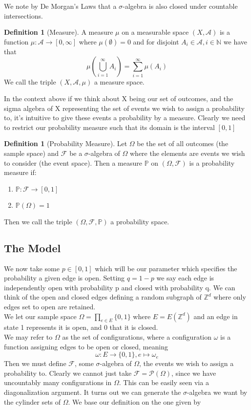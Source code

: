 \documentclass[a4paper,11pt]{article}
\theoremstyle{definition}
\newtheorem{definition}[theorem]{Definition}
\newcommand{\ints}{\mathbb{Z}}
\newcommand{\sigalg}{$\sigma$-algebra }
\begin{document}
We note by De Morgan's Laws that a $\sigma$-algebra is also closed under countable intersections.

\begin{definition}[Measure]
	A measure $\mu$ on a measurable space $(X,\mathcal{A})$ is a function $\mu: \mathcal{A} \rightarrow [0,\infty]$ where 
	$\mu(\emptyset) = 0 $ and for disjoint $A_i \in \mathcal{A}, i \in \mathbb{N}$ we have that
	$$ \mu(\bigcup^\infty_{i=1} A_i) = \sum_{i = 1}^{\infty} \mu(A_i)  $$
	We call the triple $(X,\mathcal{A},\mu)$ a measure space.
\end{definition}

In the context above if we think about X being our set of outcomes, and the sigma algebra of X representing the set of events we wish to assign a probability to, it's intuitive to give these events a probability by a measure. 
Clearly we need to restrict our probability measure such that its domain is the interval $[0,1]$ 

\begin{definition}[Probability Measure]
	Let $\Omega$ be the set of all outcomes (the sample space) and $\mathcal{F}$ be a \sigalg of $\Omega$ where the elements are events we wish to consider (the event space). Then a measure $\mathbb{P}$ on $(\Omega,\mathcal{F})$ is a probability measure if:
	\begin{enumerate}
		\item $\mathbb{P}: \mathcal{F} \rightarrow [0,1]$
		\item $\mathbb{P}(\Omega) = 1$
	\end{enumerate}
	Then we call the triple $(\Omega,\mathcal{F},\mathbb{P})$ a probability space.
	
\end{definition}

\subsection{The Model}

We now take some $p \in [0,1]$ which will be our parameter which specifies the probability a given edge is open. 
Setting $q = 1-p$ we say each edge is independently open with probability p and closed with probability q.
We can think of the open and closed edges defining a random subgraph of $\ints^d$ where only edges set to open are retained.\\

We let our sample space $\Omega = \prod_{e \in E} \{0,1\}$ where $E = E(\ints^d)$ and an edge in state 1 represents it is open, and 0 that it is closed.\\
We may refer to $\Omega$ as the set of configurations, where a configuration $\omega$ is a function assigning edges to be open or closed, meaning 
$$\omega:E \to \{0,1\}, e \mapsto \omega_e$$
Then we must define $\mathcal{F}$, some \sigalg of $\Omega$, the events we wish to assign a probability to. 
Clearly we cannot just take $\mathcal{F} = \mathcal{P}(\Omega)$, since we have uncountably many configurations in $\Omega$. 
This can be easily seen via a diagonalization argument. 
It turns out we can generate the \sigalg we want by the cylinder sets of $\Omega$. We base our definition on the one given by \cite{bollo2006}
\end{document}
